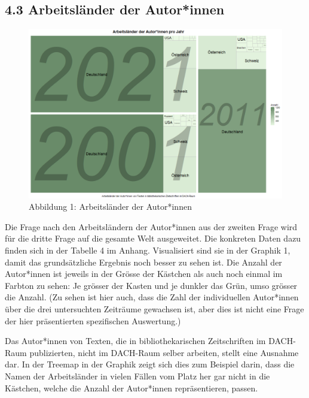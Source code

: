 \documentclass[a4paper,
fontsize=11pt,
oneside,
numbers=noperiodatend,
parskip=half-,
bibliography=totoc,
final
]{scrartcl}
\begin{document}
\hypertarget{arbeitsluxe4nder-der-autorinnen-1}{%
\subsection{4.3 Arbeitsländer der
Autor*innen}\label{arbeitsluxe4nder-der-autorinnen-1}}

\begin{figure}[p!]
\centering
\includegraphics[width=1.3\textwidth, angle=90]{img/abb1.PNG}
\caption{Abbildung 1: Arbeitsländer der Autor*innen}
\end{figure}

Die Frage nach den Arbeitsländern der Autor*innen aus der zweiten Frage
wird für die dritte Frage auf die gesamte Welt ausgeweitet. Die
konkreten Daten dazu finden sich in der Tabelle 4 im Anhang.
Visualisiert sind sie in der Graphik 1, damit das grundsätzliche
Ergebnis noch besser zu sehen ist. Die Anzahl der Autor*innen ist
jeweils in der Grösse der Kästchen als auch noch einmal im Farbton zu
sehen: Je grösser der Kasten und je dunkler das Grün, umso grösser die
Anzahl. (Zu sehen ist hier auch, dass die Zahl der individuellen
Autor*innen über die drei untersuchten Zeiträume gewachsen ist, aber
dies ist nicht eine Frage der hier präsentierten spezifischen
Auswertung.)

Das Autor*innen von Texten, die in bibliothekarischen Zeitschriften im
DACH-Raum publizierten, nicht im DACH-Raum selber arbeiten, stellt eine
Ausnahme dar. In der Treemap in der Graphik zeigt sich dies zum Beispiel
darin, dass die Namen der Arbeitsländer in vielen Fällen vom Platz her
gar nicht in die Kästchen, welche die Anzahl der Autor*innen
repräsentieren, passen.
\end{document}
